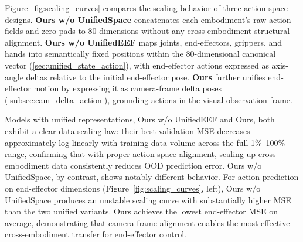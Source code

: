 Figure~\ref{fig:scaling_curves} compares the scaling behavior of three action space designs. \textbf{Ours w/o UnifiedSpace} concatenates each embodiment's raw action fields and zero-pads to 80 dimensions without any cross-embodiment structural alignment. \textbf{Ours w/o UnifiedEEF} maps joints, end-effectors, grippers, and hands into semantically fixed positions within the 80-dimensional canonical vector (\cref{sec:unified_state_action}), with end-effector actions expressed as axis-angle deltas relative to the initial end-effector pose. \textbf{Ours} further unifies end-effector motion by expressing it as camera-frame delta poses (\cref{subsec:cam_delta_action}), grounding actions in the visual observation frame.

Models with unified representations, Ours w/o UnifiedEEF and Ours, both exhibit a clear data scaling law: their best validation MSE decreases approximately log-linearly with training data volume across the full 1\%--100\% range, confirming that with proper action-space alignment, scaling up cross-embodiment data consistently reduces OOD prediction error. Ours w/o UnifiedSpace, by contrast, shows notably different behavior. For action prediction on end-effector dimensions (Figure~\ref{fig:scaling_curves}, left), Ours w/o UnifiedSpace produces an unstable scaling curve with substantially higher MSE than the two unified variants. Ours achieves the lowest end-effector MSE on average, demonstrating that camera-frame alignment enables the most effective cross-embodiment transfer for end-effector control. 



